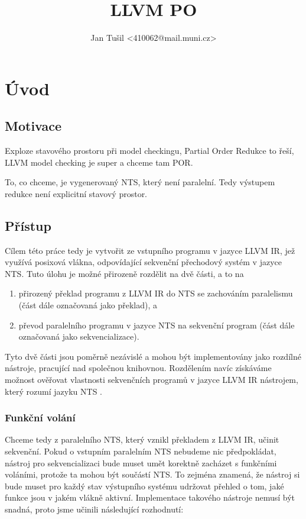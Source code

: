 \documentclass[10pt,a4paper,notitlepage]{report}
\author{Jan Tušil <410062@mail.muni.cz>}
\title{LLVM PO}
\begin{document}
\chapter{Úvod}
\section{Motivace}
Exploze stavového prostoru při model checkingu, Partial Order Redukce to řeší,
LLVM model checking je super a chceme tam POR.

To, co chceme, je vygenerovaný NTS, který není paralelní. Tedy výstupem redukce
není explicitní stavový prostor.

\section{Přístup}
Cílem této práce tedy je vytvořit ze vstupního programu v jazyce LLVM IR, jež využívá posixová vlákna, odpovídající sekvenční přechodový systém v jazyce NTS. Tuto úlohu je možné přirozeně rozdělit na dvě části, a to na
\begin{enumerate}
\item přirozený překlad programu z LLVM IR do NTS se zachováním paralelismu (část dále označovaná jako překlad), a
\item převod paralelního programu v jazyce NTS na sekvenční program (část dále označovaná jako sekvencializace).
\end{enumerate}

Tyto dvě části jsou poměrně nezávislé a mohou být implementovány jako rozdílné nástroje, pracující nad společnou knihovnou. Rozdělením navíc získáváme možnost ověřovat vlastnosti sekvenčních programů v jazyce LLVM IR nástrojem, který rozumí jazyku NTS .




\subsection{Funkční volání}

Chceme tedy z paralelního NTS, který vznikl překladem z LLVM IR, učinit sekvenční. Pokud o vstupním paralelním NTS nebudeme nic předpokládat, nástroj pro sekvencializaci bude muset umět korektně zacházet s funkčními voláními, protože ta mohou být součástí NTS. To zejména znamená, že nástroj si bude muset pro každý stav výstupního systému udržovat přehled o tom, jaké funkce jsou v jakém vlákně aktivní. Implementace takového nástroje nemusí být snadná, proto jsme učinili následující rozhodnutí:
\end{document}
